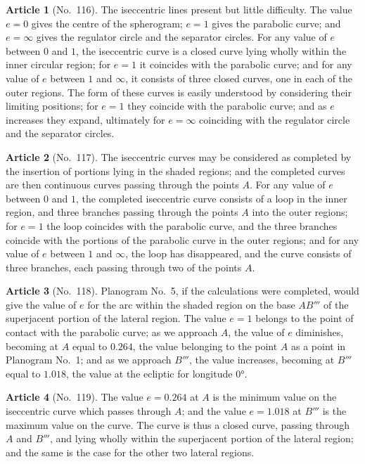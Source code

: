 \documentclass[11pt,a4paper]{article}
\theoremstyle{definition}
\newtheorem{art}{Article}
\begin{document}
\begin{art}[No.~116]
The iseccentric lines present but little difficulty. The value $e = 0$ gives the centre of the spherogram; $e = 1$ gives the parabolic curve; and $e = \infty$ gives the regulator circle and the separator circles. For any value of $e$ between $0$ and $1$, the iseccentric curve is a closed curve lying wholly within the inner circular region; for $e = 1$ it coincides with the parabolic curve; and for any value of $e$ between $1$ and $\infty$, it consists of three closed curves, one in each of the outer regions. The form of these curves is easily understood by considering their limiting positions; for $e = 1$ they coincide with the parabolic curve; and as $e$ increases they expand, ultimately for $e = \infty$ coinciding with the regulator circle and the separator circles.
\end{art}

\begin{art}[No.~117]
The iseccentric curves may be considered as completed by the insertion of portions lying in the shaded regions; and the completed curves are then continuous curves passing through the points $A$. For any value of $e$ between $0$ and $1$, the completed iseccentric curve consists of a loop in the inner region, and three branches passing through the points $A$ into the outer regions; for $e = 1$ the loop coincides with the parabolic curve, and the three branches coincide with the portions of the parabolic curve in the outer regions; and for any value of $e$ between $1$ and $\infty$, the loop has disappeared, and the curve consists of three branches, each passing through two of the points $A$.
\end{art}


\begin{art}[No.~118]
Planogram No.~5, if the calculations were completed, would give the value of $e$ for the arc within the shaded region on the base $AB'''$ of the superjacent portion of the lateral region. The value $e = 1$ belongs to the point of contact with the parabolic curve; as we approach $A$, the value of $e$ diminishes, becoming at $A$ equal to $0.264$, the value belonging to the point $A$ as a point in Planogram No.~1; and as we approach $B'''$, the value increases, becoming at $B'''$ equal to $1.018$, the value at the ecliptic for longitude $0°$.
\end{art}

\begin{art}[No.~119]
The value $e = 0.264$ at $A$ is the minimum value on the iseccentric curve which passes through $A$; and the value $e = 1.018$ at $B'''$ is the maximum value on the curve. The curve is thus a closed curve, passing through $A$ and $B'''$, and lying wholly within the superjacent portion of the lateral region; and the same is the case for the other two lateral regions.
\end{art}
\end{document}
